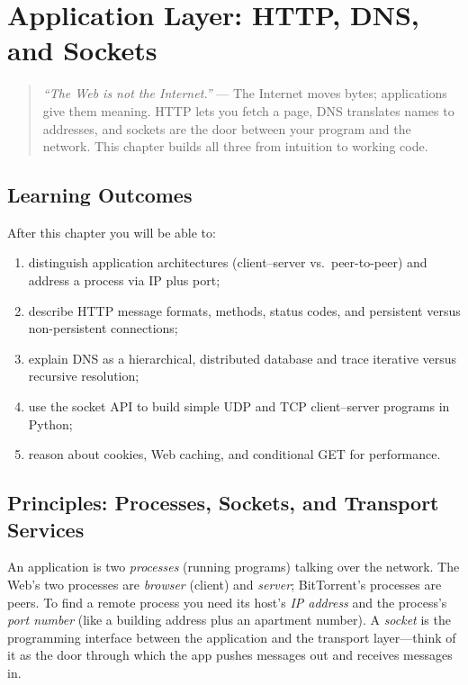 \chapter{Application Layer: HTTP, DNS, and Sockets}
\label{ch:application}

\begin{quote}
\emph{``The Web is not the Internet.''} --- The Internet moves bytes; applications give them meaning. HTTP lets you fetch a page, DNS translates names to addresses, and sockets are the door between your program and the network. This chapter builds all three from intuition to working code.
\end{quote}

\noindent{}

\section*{Learning Outcomes}
After this chapter you will be able to:
\begin{enumerate}[label=(L\arabic*)]
    \item distinguish application architectures (client--server vs.\ peer-to-peer) and address a process via IP plus port;
    \item describe HTTP message formats, methods, status codes, and persistent versus non-persistent connections;
    \item explain DNS as a hierarchical, distributed database and trace iterative versus recursive resolution;
    \item use the socket API to build simple UDP and TCP client--server programs in Python;
    \item reason about cookies, Web caching, and conditional GET for performance.
\end{enumerate}

\section{Principles: Processes, Sockets, and Transport Services}
\label{sec:app-principles}
An application is two \emph{processes} (running programs) talking over the network. The Web's two processes are \emph{browser} (client) and \emph{server}; BitTorrent's processes are peers. To find a remote process you need its host's \emph{IP address} and the process's \emph{port number} (like a building address plus an apartment number). A \emph{socket} is the programming interface between the application and the transport layer---think of it as the door through which the app pushes messages out and receives messages in.

